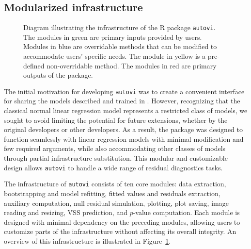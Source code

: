 \documentclass[
doublespace,
  times]{anzsauth}
\begin{document}
\subsection{Modularized infrastructure}\label{sec-autovi-infrastructure}

\begin{figure}


\caption{\label{fig-autovi-diag}Diagram illustrating the infrastructure
of the R package \texttt{autovi}. The modules in green are primary
inputs provided by users. Modules in blue are overridable methods that
can be modified to accommodate users' specific needs. The module in
yellow is a pre-defined non-overridable method. The modules in red are
primary outputs of the package.}

\end{figure}%

The initial motivation for developing \texttt{autovi} was to create a
convenient interface for sharing the models described and trained in
\citet{li2024automated}. However, recognizing that the classical normal
linear regression model represents a restricted class of models, we
sought to avoid limiting the potential for future extensions, whether by
the original developers or other developers. As a result, the package
was designed to function seamlessly with linear regression models with
minimal modification and few required arguments, while also
accommodating other classes of models through partial infrastructure
substitution. This modular and customizable design allows
\texttt{autovi} to handle a wide range of residual diagnostics tasks.

The infrastructure of \texttt{autovi} consists of ten core modules: data
extraction, bootstrapping and model refitting, fitted values and
residuals extraction, auxiliary computation, null residual simulation,
plotting, plot saving, image reading and resizing, VSS prediction, and
\(p\)-value computation. Each module is designed with minimal dependency
on the preceding modules, allowing users to customize parts of the
infrastructure without affecting its overall integrity. An overview of
this infrastructure is illustrated in Figure~\ref{fig-autovi-diag}.
\end{document}
